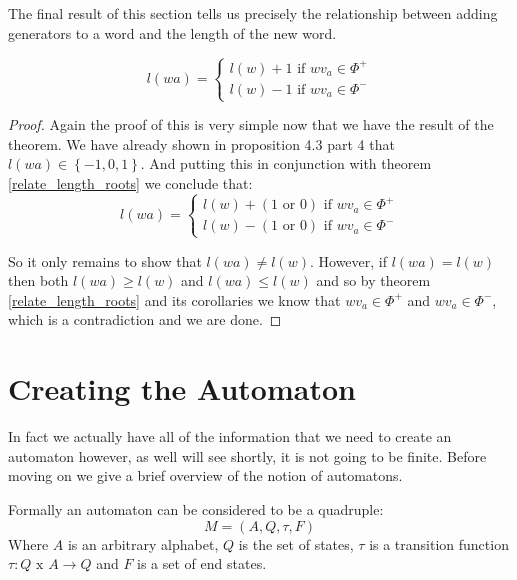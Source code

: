 \documentclass[a4paper,12pt]{article}
\begin{document}
The final result of this section tells us precisely the relationship between adding generators to a word and the length of the new word.

\begin{cor}
	\label{cor_relate_root_length}
	\begin{equation*}
		l(wa) = 
		\begin{cases}
			l(w) + 1 \text{ if } wv_a \in \Phi^+ \\
			l(w) - 1 \text{ if } wv_a \in \Phi^-
		\end{cases}
	\end{equation*}
\end{cor}

\begin{proof}
	Again the proof of this is very simple now that we have the result of the theorem. We have already shown in proposition 4.3 part 4 that $l(wa) \in \left\{-1, 0, 1\right\}$. And putting this in conjunction with theorem \ref{relate_length_roots} we conclude that:
	\begin{equation*}
		l(wa) = 
		\begin{cases}
			l(w) + (1 \text{ or } 0) \text{ if } wv_a \in \Phi^+ \\
			l(w) - (1 \text{ or } 0) \text{ if } wv_a \in \Phi^-
		\end{cases}
	\end{equation*}
	
	So it only remains to show that $l(wa) \neq l(w)$. However, if $l(wa) = l(w)$ then both $l(wa) \geq l(w)$ and $l(wa) \leq l(w)$ and so by theorem \ref{relate_length_roots} and its corollaries we know that $wv_a \in \Phi^+$ and $wv_a \in \Phi^-$, which is a contradiction and we are done.
\end{proof}

\section{Creating the Automaton}

In fact we actually have all of the information that we need to create an automaton however, as well will see shortly, it is not going to be finite. Before moving on we give a brief overview of the notion of automatons.

\begin{definition}
	Formally an automaton can be considered to be a quadruple:
	\[M = (A, Q, \tau, F)\]
	Where $A$ is an arbitrary alphabet, $Q$ is the set of states, $\tau$ is a transition function $\tau: Q \text{ x } A \rightarrow Q$ and $F$ is a set of end states.
\end{definition}
\end{document}
